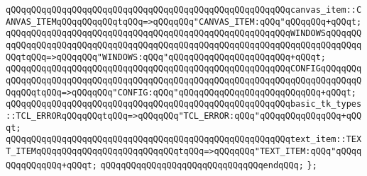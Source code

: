 \verb|qQQqqQQqqQQqqQQqqQQqqQQqqQQqqQQqqQQqqQQqqQQqqQQqqQQqqQQqcanvas_item::CANVAS_ITEMqQQqqQQqqQQqtqQQq=>qQQqqQQq"CANVAS_ITEM:qQQq"qQQqqQQq+qQQqt;|\newline
\verb|qQQqqQQqqQQqqQQqqQQqqQQqqQQqqQQqqQQqqQQqqQQqqQQqqQQqqQQqWINDOWSqQQqqQQqqQQqqQQqqQQqqQQqqQQqqQQqqQQqqQQqqQQqqQQqqQQqqQQqqQQqqQQqqQQqqQQqqQQqqQQqtqQQq=>qQQqqQQq"WINDOWS:qQQq"qQQqqQQqqQQqqQQqqQQqqQQq+qQQqt;|\newline
\verb|qQQqqQQqqQQqqQQqqQQqqQQqqQQqqQQqqQQqqQQqqQQqqQQqqQQqqQQqCONFIGqQQqqQQqqQQqqQQqqQQqqQQqqQQqqQQqqQQqqQQqqQQqqQQqqQQqqQQqqQQqqQQqqQQqqQQqqQQqqQQqqQQqtqQQq=>qQQqqQQq"CONFIG:qQQq"qQQqqQQqqQQqqQQqqQQqqQQqqQQq+qQQqt;|\newline
\verb|qQQqqQQqqQQqqQQqqQQqqQQqqQQqqQQqqQQqqQQqqQQqqQQqqQQqqQQqbasic_tk_types::TCL_ERRORqQQqqQQqtqQQq=>qQQqqQQq"TCL_ERROR:qQQq"qQQqqQQqqQQqqQQq+qQQqt;|\newline
\verb|qQQqqQQqqQQqqQQqqQQqqQQqqQQqqQQqqQQqqQQqqQQqqQQqqQQqqQQqtext_item::TEXT_ITEMqQQqqQQqqQQqqQQqqQQqqQQqqQQqtqQQq=>qQQqqQQq"TEXT_ITEM:qQQq"qQQqqQQqqQQqqQQq+qQQqt;|\newline
\verb|qQQqqQQqqQQqqQQqqQQqqQQqqQQqqQQqendqQQq;|\newline
\newline
\verb|};|\newline
\newline
\newline
\newline

